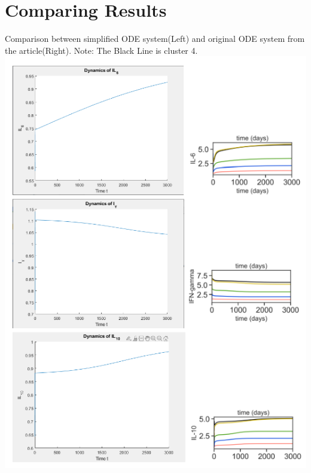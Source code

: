 \documentclass{article}
\begin{document}
\section{Comparing Results}
\label{appendix:graph}
Comparison between simplified ODE system(Left) and original ODE system from the article(Right). Note: The Black Line is cluster 4.\\
\includegraphics[]{comp1.PNG}\\
\newpage
\end{document}
